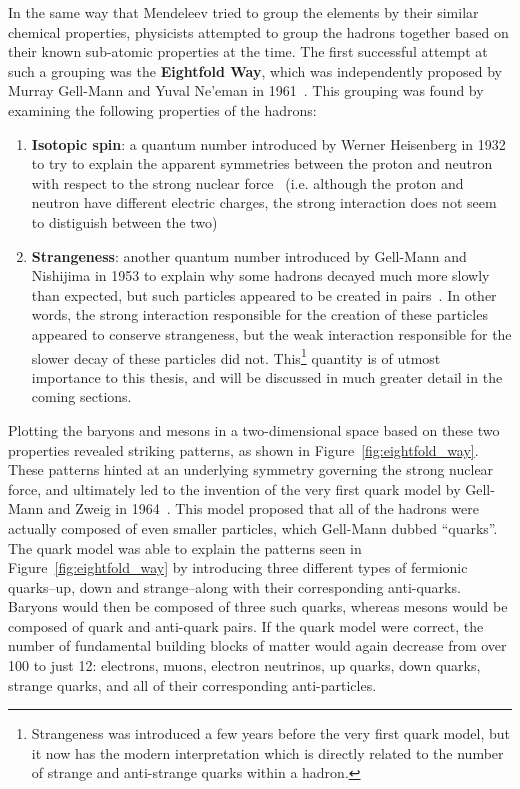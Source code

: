 In the same way that Mendeleev tried to group the elements by their similar chemical properties, physicists attempted to group the hadrons together based on their known sub-atomic properties at the time. The first successful attempt at such a grouping was the \textbf{Eightfold Way}, which was independently proposed by Murray Gell-Mann and Yuval Ne'eman in 1961~\cite{GellMann, Neeman}. This grouping was found by examining the following properties of the hadrons:
%
\begin{enumerate}
    \item \textbf{Isotopic spin}: a quantum number introduced by Werner Heisenberg in 1932 to try to explain the apparent symmetries between the proton and neutron with respect to the strong nuclear force~\cite{IsotopicSpin} (i.e. although the proton and neutron have different electric charges, the strong interaction does not seem to distiguish between the two)
    \item \textbf{Strangeness}: another quantum number introduced by Gell-Mann and Nishijima in 1953 to explain why some hadrons decayed much more slowly than expected, but such particles appeared to be created in pairs~\cite{Strangeness}. In other words, the strong interaction responsible for the creation of these particles appeared to conserve strangeness, but the weak interaction responsible for the slower decay of these particles did not. This\footnote{Strangeness was introduced a few years before the very first quark model, but it now has the modern interpretation which is directly related to the number of strange and anti-strange quarks within a hadron.} quantity is of utmost importance to this thesis, and will be discussed in much greater detail in the coming sections.
\end{enumerate}
%
Plotting the baryons and mesons in a two-dimensional space based on these two properties revealed striking patterns, as shown in Figure~\ref{fig:eightfold_way}. These patterns hinted at an underlying symmetry governing the strong nuclear force, and ultimately led to the invention of the very first quark model by Gell-Mann and Zweig in 1964~\cite{QuarkModel}. This model proposed that all of the hadrons were actually composed of even smaller particles, which Gell-Mann dubbed ``quarks''. The quark model was able to explain the patterns seen in Figure~\ref{fig:eightfold_way} by introducing three different types of fermionic quarks--up, down and strange--along with their corresponding anti-quarks. Baryons would then be composed of three such quarks, whereas mesons would be composed of quark and anti-quark pairs. If the quark model were correct, the number of fundamental building blocks of matter would again decrease from over 100 to just 12: electrons, muons, electron neutrinos, up quarks, down quarks, strange quarks, and all of their corresponding anti-particles.

